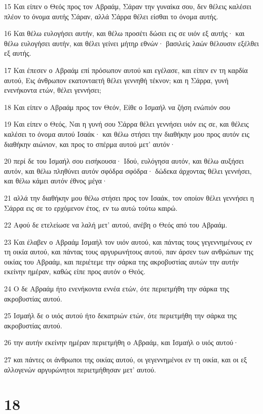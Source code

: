 \par 15 Και είπεν ο Θεός προς τον Αβραάμ, Σάραν την γυναίκα σου, δεν θέλεις καλέσει πλέον το όνομα αυτής Σάραν, αλλά Σάρρα θέλει είσθαι το όνομα αυτής.
\par 16 Και θέλω ευλογήσει αυτήν, και θέλω προσέτι δώσει εις σε υιόν εξ αυτής· και θέλω ευλογήσει αυτήν, και θέλει γείνει μήτηρ εθνών· βασιλείς λαών θέλουσιν εξέλθει εξ αυτής.
\par 17 Και έπεσεν ο Αβραάμ επί πρόσωπον αυτού και εγέλασε, και είπεν εν τη καρδία αυτού, Εις άνθρωπον εκατονταετή θέλει γεννηθή τέκνον; και η Σάρρα, γυνή ενενήκοντα ετών, θέλει γεννήσει;
\par 18 Και είπεν ο Αβραάμ προς τον Θεόν, Είθε ο Ισμαήλ να ζήση ενώπιόν σου
\par 19 Και είπεν ο Θεός, Ναι η γυνή σου Σάρρα θέλει γεννήσει υιόν εις σε, και θέλεις καλέσει το όνομα αυτού Ισαάκ· και θέλω στήσει την διαθήκην μου προς αυτόν εις διαθήκην αιώνιον, και προς το σπέρμα αυτού μετ' αυτόν·
\par 20 περί δε του Ισμαήλ σου εισήκουσα· Ιδού, ευλόγησα αυτόν, και θέλω αυξήσει αυτόν, και θέλω πληθύνει αυτόν σφόδρα σφόδρα· δώδεκα άρχοντας θέλει γεννήσει, και θέλω κάμει αυτόν έθνος μέγα·
\par 21 αλλά την διαθήκην μου θέλω στήσει προς τον Ισαάκ, τον οποίον θέλει γεννήσει η Σάρρα εις σε το ερχόμενον έτος, εν τω αυτώ τούτω καιρώ.
\par 22 Αφού δε ετελείωσε να λαλή μετ' αυτού, ανέβη ο Θεός από του Αβραάμ.
\par 23 Και έλαβεν ο Αβραάμ Ισμαήλ τον υιόν αυτού, και πάντας τους γεγεννημένους εν τη οικία αυτού, και πάντας τους αργυρωνήτους αυτού, παν άρσεν των ανθρώπων της οικίας του Αβραάμ, και περιέτεμε την σάρκα της ακροβυστίας αυτών την αυτήν εκείνην ημέραν, καθώς είπε προς αυτόν ο Θεός.
\par 24 Ο δε Αβραάμ ήτο ενενήκοντα εννέα ετών, ότε περιετμήθη την σάρκα της ακροβυστίας αυτού.
\par 25 Ισμαήλ δε ο υιός αυτού ήτο δεκατριών ετών, ότε περιετμήθη την σάρκα της ακροβυστίας αυτού.
\par 26 την αυτήν εκείνην ημέραν περιετμήθη ο Αβραάμ, και Ισμαήλ ο υιός αυτού·
\par 27 και πάντες οι άνθρωποι της οικίας αυτού, οι γεγεννημένοι εν τη οικία, και οι εξ αλλογενών αργυρώνητοι περιετμήθησαν μετ' αυτού.

\chapter{18}

